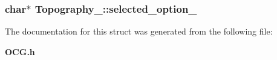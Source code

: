 \subsubsection[{selected\_\-option\_\-}]{\setlength{\rightskip}{0pt plus 5cm}char$\ast$ {\bf Topography\_\-::selected\_\-option\_\-}}\label{structTopography___333e24cdb93fa6d5044c2471fe5511dc}




The documentation for this struct was generated from the following file:\begin{CompactItemize}
\item 
{\bf OCG.h}\end{CompactItemize}
